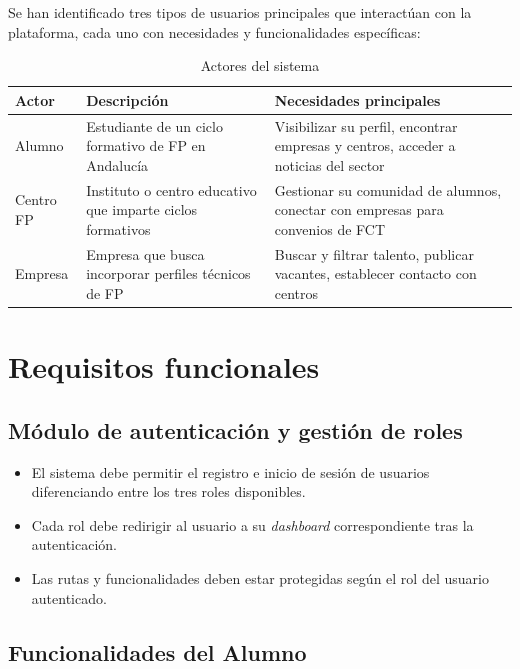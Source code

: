 \documentclass[12pt, a4paper]{report}
\begin{document}
Se han identificado tres tipos de usuarios principales que interactúan con la plataforma, cada uno con
necesidades y funcionalidades específicas:

\vspace{0.5em}
\begin{table}[H]
  \centering
  \caption{Actores del sistema}
  \begin{tabularx}{\textwidth}{lXX}
    \toprule
    \textbf{Actor} & \textbf{Descripción} & \textbf{Necesidades principales} \\
    \midrule
    Alumno    & Estudiante de un ciclo formativo de FP en Andalucía
              & Visibilizar su perfil, encontrar empresas y centros, acceder a noticias del sector \\
    \addlinespace
    Centro FP & Instituto o centro educativo que imparte ciclos formativos
              & Gestionar su comunidad de alumnos, conectar con empresas para convenios de FCT \\
    \addlinespace
    Empresa   & Empresa que busca incorporar perfiles técnicos de FP
              & Buscar y filtrar talento, publicar vacantes, establecer contacto con centros \\
    \bottomrule
  \end{tabularx}
\end{table}

\section{Requisitos funcionales}

\subsection{Módulo de autenticación y gestión de roles}

\begin{itemize}
  \item El sistema debe permitir el registro e inicio de sesión de usuarios diferenciando entre los
        tres roles disponibles.
  \item Cada rol debe redirigir al usuario a su \emph{dashboard} correspondiente tras la autenticación.
  \item Las rutas y funcionalidades deben estar protegidas según el rol del usuario autenticado.
\end{itemize}

\subsection{Funcionalidades del Alumno}
\end{document}
